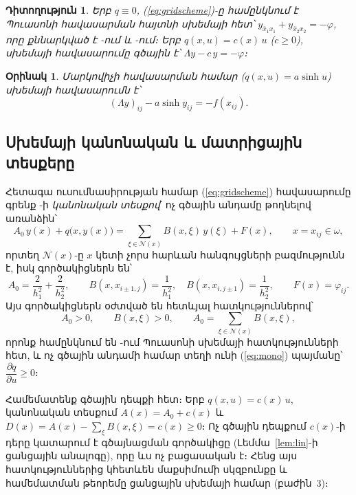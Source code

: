 \documentclass[12pt,a4paper]{article}
\theoremstyle{arm}
\theoremstyle{armdef}
\newtheorem{remark}{Դիտողություն}
\newtheorem{example}{Օրինակ}
\numberwithin{equation}{section}
\newcommand{\dd}[2]{\dfrac{\partial #1}{\partial #2}}
\begin{document}
\begin{remark}
Երբ $q\equiv0$, (\ref{eq:gridscheme})-ը համընկնում է Պուասոնի հավասարման հայտնի սխեմայի հետ՝ $y_{\bar x_1x_1}+y_{\bar x_2x_2}=-\varphi$, որը քննարկված է \cite[մաս~III, գլ.~2, §~1, (3)--(4) բանաձևեր, էջ~292]{sam}-ում և \cite[գլ.~10, §~6, (3)--(4) բանաձևեր]{bakh}-ում։ Երբ $q(x,u)=c(x)\,u$ ($c\ge0$), սխեմայի հավասարումը գծային է՝ $\Lambda y-c\,y=-\varphi$։
\end{remark}

\begin{example}
Մարկովիչի հավասարման համար ($q(x,u)=a\sinh u$) սխեմայի հավասարումն է՝
\[(\Lambda y)_{ij}-a\sinh y_{ij}=-f(x_{ij}).\]
\end{example}

\subsection{Սխեմայի կանոնական և մատրիցային տեսքերը}

Հետագա ուսումնասիրության համար (\ref{eq:gridscheme}) հավասարումը գրենք \cite[մաս~III, գլ.~2, §~1, կետ~2, էջ~293]{sam}-ի \emph{կանոնական տեսքով}՝ ոչ գծային անդամը թողնելով առանձին՝
\begin{equation}\label{eq:canon}
A_0\,y(x)+q\big(x,y(x)\big)=\sum_{\xi\in\mathcal N(x)}B(x,\xi)\,y(\xi)+F(x),\qquad x=x_{ij}\in\omega,
\end{equation}
որտեղ $\mathcal N(x)$-ը $x$ կետի չորս հարևան հանգույցների բազմությունն է, իսկ գործակիցներն են՝
\begin{equation}\label{eq:ABF}
A_0=\frac{2}{h_1^2}+\frac{2}{h_2^2},\qquad
B(x,x_{i\pm1,j})=\frac1{h_1^2},\quad B(x,x_{i,j\pm1})=\frac1{h_2^2},\qquad F(x)=\varphi_{ij}.
\end{equation}
Այս գործակիցներն օժտված են հետևյալ հատկություններով՝
\begin{equation}\label{eq:props}
A_0>0,\qquad B(x,\xi)>0,\qquad A_0=\sum_{\xi\in\mathcal N(x)}B(x,\xi),
\end{equation}
որոնք համընկնում են \cite[մաս~III, գլ.~2, §~1, (8) պայմաններ, էջ~294]{sam}-ում Պուասոնի սխեմայի հատկությունների հետ, և ոչ գծային անդամի համար տեղի ունի (\ref{eq:mono}) պայմանը՝ $\dd{q}{u}\ge0$։

Համեմատենք գծային դեպքի հետ։ Երբ $q(x,u)=c(x)\,u$, կանոնական տեսքում $A(x)=A_0+c(x)$ և $D(x)=A(x)-\sum_{\xi}B(x,\xi)=c(x)\ge0$։ Ոչ գծային դեպքում $c(x)$-ի դերը կատարում է գծայնացման գործակիցը (Լեմմա~\ref{lem:lin}-ի ցանցային անալոգը), որը ևս ոչ բացասական է։ Հենց այս հատկություններից կհետևեն մաքսիմումի սկզբունքը և համեմատման թեորեմը ցանցային սխեմայի համար (բաժին~3)։
\end{document}
